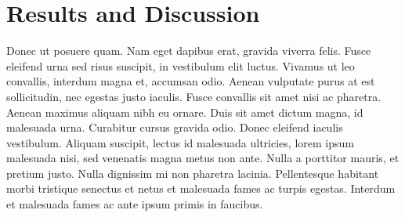\section{Results and Discussion}

Donec ut posuere quam. Nam eget dapibus erat, gravida viverra felis. Fusce eleifend urna sed risus suscipit, in vestibulum elit luctus. Vivamus ut leo convallis, interdum magna et, accumsan odio. Aenean vulputate purus at est sollicitudin, nec egestas justo iaculis. Fusce convallis sit amet nisi ac pharetra. Aenean maximus aliquam nibh eu ornare. Duis sit amet dictum magna, id malesuada urna. Curabitur cursus gravida odio. Donec eleifend iaculis vestibulum. Aliquam suscipit, lectus id malesuada ultricies, lorem ipsum malesuada nisi, sed venenatis magna metus non ante. Nulla a porttitor mauris, et pretium justo. Nulla dignissim mi non pharetra lacinia. Pellentesque habitant morbi tristique senectus et netus et malesuada fames ac turpis egestas. Interdum et malesuada fames ac ante ipsum primis in faucibus.